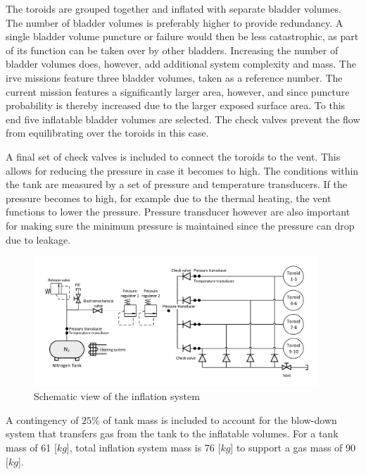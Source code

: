 The toroids are grouped together and inflated with separate bladder volumes.  The number of bladder volumes is preferably higher to provide redundancy. A single bladder volume puncture or failure would then be less catastrophic, as part of its function can be taken over by other bladders. Increasing the number of bladder volumes does, however, add additional system complexity and mass. The \gls{irve} missions feature three bladder volumes, taken as a reference number. The current mission features a significantly larger area, however, and since puncture probability is thereby increased due to the larger exposed surface area. To this end five inflatable bladder volumes are selected. The check valves prevent the flow from equilibrating over the toroids in this case.

A final set of check valves is included to connect the toroids to the vent. This allows for reducing the pressure in case it becomes to high. The conditions within the tank are measured by a set of pressure and temperature transducers. If the pressure becomes to high, for example due to the thermal heating, the vent functions to lower the pressure. Pressure transducer however are also important for making sure the minimum pressure is maintained since the pressure can drop due to leakage. 

\begin{figure}[h]
		\centering
		\includegraphics[width=0.95\textwidth]{./Figure/Structure/infsys.pdf}
		\caption[Schematic view of the inflation system]{Schematic view of the inflation system}%
		\label{fig:infsys}
\end{figure}


A contingency of $25\%$ of tank mass is included to account for the blow-down system that transfers gas from the tank to the inflatable volumes. For a tank mass of 61 [$kg$], total inflation system mass is 76 [$kg$] to support a gas mass of 90 [$kg$].






